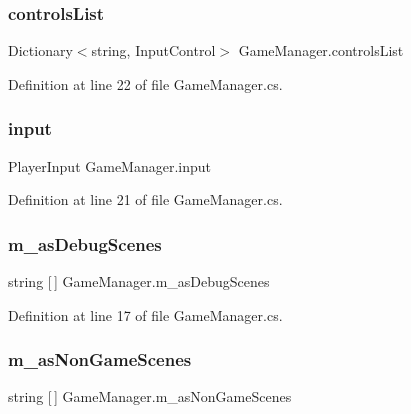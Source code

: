 \subsubsection{\texorpdfstring{controls\+List}{controlsList}}
{\footnotesize\ttfamily Dictionary$<$string, Input\+Control$>$ Game\+Manager.\+controls\+List}



Definition at line 22 of file Game\+Manager.\+cs.

\mbox{\label{class_game_manager_ab233485503b57111cd2c5aa0ddc3b0ec}} 
\subsubsection{\texorpdfstring{input}{input}}
{\footnotesize\ttfamily Player\+Input Game\+Manager.\+input}



Definition at line 21 of file Game\+Manager.\+cs.

\mbox{\label{class_game_manager_a08c09884a7b006f6e34b9a97791ad8e9}} 
\subsubsection{\texorpdfstring{m\+\_\+as\+Debug\+Scenes}{m\_asDebugScenes}}
{\footnotesize\ttfamily string \mbox{[}$\,$\mbox{]} Game\+Manager.\+m\+\_\+as\+Debug\+Scenes}



Definition at line 17 of file Game\+Manager.\+cs.

\mbox{\label{class_game_manager_aa64096e52946d57a561f6182aa56380e}} 
\subsubsection{\texorpdfstring{m\+\_\+as\+Non\+Game\+Scenes}{m\_asNonGameScenes}}
{\footnotesize\ttfamily string \mbox{[}$\,$\mbox{]} Game\+Manager.\+m\+\_\+as\+Non\+Game\+Scenes}



